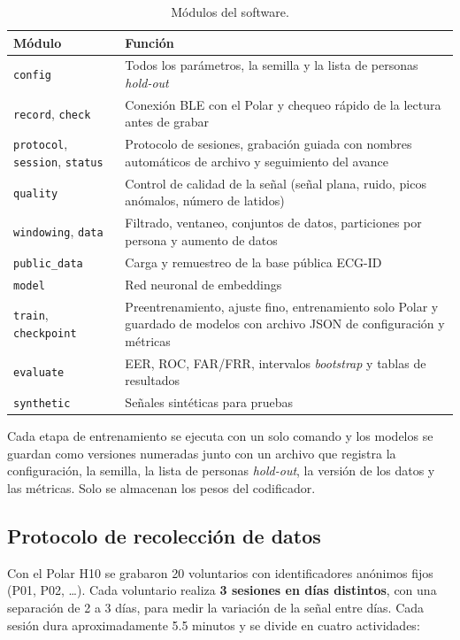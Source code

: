 \begin{table}[htbp]
\centering
\caption{Módulos del software.}
\label{tab:modulos}
\small
\begin{tabularx}{\textwidth}{l X}
\toprule
\textbf{Módulo} & \textbf{Función} \\
\midrule
\texttt{config} & Todos los parámetros, la semilla y la lista de personas \emph{hold-out} \\
\texttt{record}, \texttt{check} & Conexión BLE con el Polar y chequeo rápido de la lectura antes de grabar \\
\texttt{protocol}, \texttt{session}, \texttt{status} & Protocolo de sesiones, grabación guiada con nombres automáticos de archivo y seguimiento del avance \\
\texttt{quality} & Control de calidad de la señal (señal plana, ruido, picos anómalos, número de latidos) \\
\texttt{windowing}, \texttt{data} & Filtrado, ventaneo, conjuntos de datos, particiones por persona y aumento de datos \\
\texttt{public\_data} & Carga y remuestreo de la base pública ECG-ID \\
\texttt{model} & Red neuronal de embeddings \\
\texttt{train}, \texttt{checkpoint} & Preentrenamiento, ajuste fino, entrenamiento solo Polar y guardado de modelos con archivo JSON de configuración y métricas \\
\texttt{evaluate} & EER, ROC, FAR/FRR, intervalos \emph{bootstrap} y tablas de resultados \\
\texttt{synthetic} & Señales sintéticas para pruebas \\
\bottomrule
\end{tabularx}
\end{table}

Cada etapa de entrenamiento se ejecuta con un solo comando y los modelos se guardan como versiones numeradas junto con un archivo que registra la configuración, la semilla, la lista de personas \emph{hold-out}, la versión de los datos y las métricas. Solo se almacenan los pesos del codificador.

\subsection{Protocolo de recolección de datos}

Con el Polar H10 se grabaron 20 voluntarios con identificadores anónimos fijos (P01, P02, \dots). Cada voluntario realiza \textbf{3 sesiones en días distintos}, con una separación de 2 a 3 días, para medir la variación de la señal entre días. Cada sesión dura aproximadamente 5.5 minutos y se divide en cuatro actividades:

